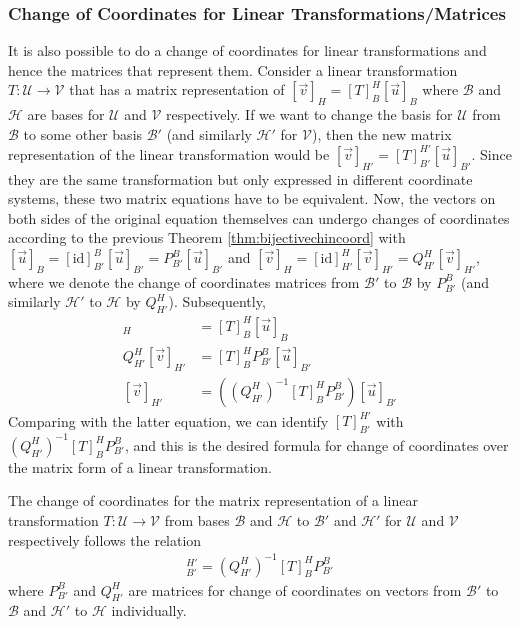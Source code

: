 \subsubsection{Change of Coordinates for Linear Transformations/Matrices}

It is also possible to do a change of coordinates for linear transformations and hence the matrices that represent them. Consider a linear transformation $T: \mathcal{U} \to \mathcal{V}$ that has a matrix representation of $[\vec{v}]_H = [T]_B^H[\vec{u}]_B$ where $\mathcal{B}$ and $\mathcal{H}$ are bases for $\mathcal{U}$ and $\mathcal{V}$ respectively. If we want to change the basis for $\mathcal{U}$ from $\mathcal{B}$ to some other basis $\mathcal{B}'$ (and similarly $\mathcal{H}'$ for $\mathcal{V}$), then the new matrix representation of the linear transformation would be $[\vec{v}]_{H'} = [T]_{B'}^{H'}[\vec{u}]_{B'}$. Since they are the same transformation but only expressed in different coordinate systems, these two matrix equations have to be equivalent. Now, the vectors on both sides of the original equation themselves can undergo changes of coordinates according to the previous Theorem \ref{thm:bijectivechincoord} with $[\vec{u}]_B = [\text{id}]_{B'}^B [\vec{u}]_{B'} = P_{B'}^B [\vec{u}]_{B'}$ and $[\vec{v}]_{H} = [\text{id}]_{H'}^{H} [\vec{v}]_{H'} = Q_{H'}^H [\vec{v}]_{H'}$, where we denote the change of coordinates matrices from $\mathcal{B'}$ to $\mathcal{B}$ by $P_{B'}^{B}$ (and similarly  $\mathcal{H'}$ to $\mathcal{H}$ by $Q_{H'}^{H}$). Subsequently,
\begin{align*}
[\vec{v}]_H &= [T]_B^H[\vec{u}]_B \\
Q_{H'}^H [\vec{v}]_{H'} &= [T]_B^H P_{B'}^B [\vec{u}]_{B'} \\
[\vec{v}]_{H'} &= \left( (Q_{H'}^H)^{-1} [T]_B^H P_{B'}^B \right) [\vec{u}]_{B'}
\end{align*}
Comparing with the latter equation, we can identify $[T]_{B'}^{H'}$ with $(Q_{H'}^H)^{-1} [T]_B^H P_{B'}^B$, and this is the desired formula for change of coordinates over the matrix form of a linear transformation.
\begin{proper}
\label{proper:chcoordsmat}
The change of coordinates for the matrix representation of a linear transformation $T: \mathcal{U} \to \mathcal{V}$ from bases $\mathcal{B}$ and $\mathcal{H}$ to $\mathcal{B}'$ and $\mathcal{H}'$ for $\mathcal{U}$ and $\mathcal{V}$ respectively follows the relation
\begin{align*}
[T]_{B'}^{H'} = (Q_{H'}^H)^{-1} [T]_B^H P_{B'}^B
\end{align*}
where $P_{B'}^{B}$ and $Q_{H'}^{H}$ are matrices for change of coordinates on vectors from $\mathcal{B'}$ to $\mathcal{B}$ and $\mathcal{H'}$ to $\mathcal{H}$ individually.
\end{proper}
